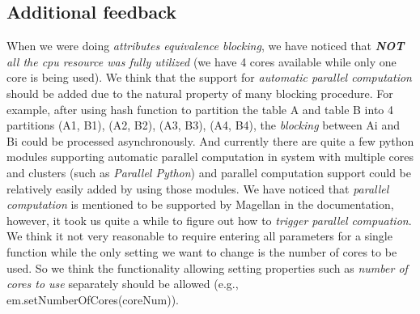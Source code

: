 \documentclass[10pt, oneside]{article}
\begin{document}
\subsection*{Additional feedback} 
When we were doing \textit{attributes equivalence blocking}, we have noticed that \textit{\textbf{NOT} all the cpu resource was fully utilized} (we have 4 cores available while only one core is being used). We think that 
the support for \textit{automatic parallel computation} should be added due to the natural property of many blocking procedure. For example, after using hash function to partition the table A and table B 
into 4 partitions (A1, B1), (A2, B2), (A3, B3), (A4, B4), the \textit{blocking} between Ai and Bi could be processed asynchronously. And currently there are quite a few python modules supporting automatic parallel computation in system with multiple cores and clusters (such as \textit{Parallel Python}) and parallel computation support could be relatively easily added by using those modules. We have noticed that \textit{parallel computation} is mentioned to be 
supported by Magellan in the documentation, however, it took us quite a while to figure out how to \textit{trigger parallel compuation}. We think it not very reasonable to require entering all parameters for a single function while the only setting we want to change is the number of cores to be used. So we think the functionality allowing setting properties such as \textit{number of cores to use} separately should be allowed (e.g., em.setNumberOfCores(coreNum)). 
\end{document}
